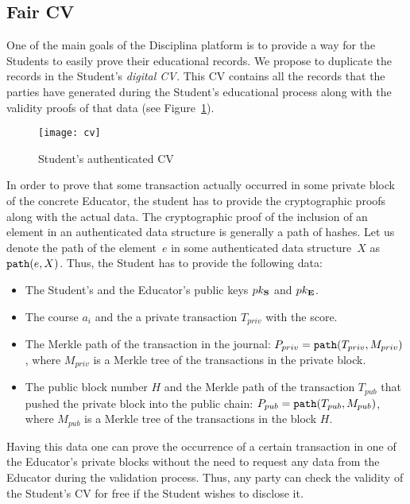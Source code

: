 \subsection{Fair CV}
\label{sec:fair-cv}
One of the main goals of the Disciplina platform is to provide a way for the Students to easily prove their educational records. We propose to duplicate the records in the Student's \textit{digital CV.} This CV contains all the records that the parties have generated during the Student's educational process along with the validity proofs of that data (see Figure~\ref{fig:cv}).

\begin{figure}[ht]
\centering
\texttt{[image: cv]}
\caption{Student's authenticated CV}
\label{fig:cv}
\end{figure}

In order to prove that some transaction actually occurred in some private block of the concrete Educator, the student has to provide the cryptographic proofs along with the actual data. The cryptographic proof of the inclusion of an element in an authenticated data structure is generally a path of hashes. Let us denote the path of the element~$e$ in some authenticated data structure~$X$ as~$\mathtt{path}(e, X)$. Thus, the Student has to  provide the following data:
\begin{itemize}
  \item The Student's and the Educator's public keys $pk_{\mathbf{S}}$ and $pk_{\mathbf{E}}$.
  \item The course $a_i$ and the a private transaction $T_{priv}$ with the score.
  \item The Merkle path of the transaction in the journal: $P_{priv} = \mathtt{path}(T_{priv}, M_{priv})$, where $M_{priv}$ is a Merkle tree of the transactions in the private block.
  \item The public block number $H$ and the Merkle path of the transaction $T_{pub}$ that pushed the private block into the public chain: $P_{pub} = \mathtt{path}(T_{pub}, M_{pub})$, where $M_{pub}$ is a Merkle tree of the transactions in the block $H$.
\end{itemize}

Having this data one can prove the occurrence of a certain transaction in one of the Educator's private blocks without the need to request any data from the Educator during the validation process. Thus, any party can check the validity of the Student's CV for free if the Student wishes to disclose it.

